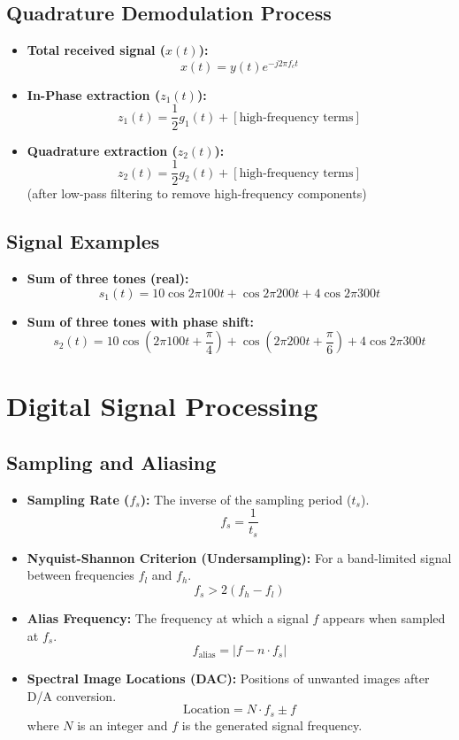 \documentclass{article}
\begin{document}
\subsection*{Quadrature Demodulation Process}
\begin{itemize}
    \item \textbf{Total received signal ($x(t)$):}
    \[
    x(t) = y(t) e^{-j2\pi f_c t}
    \]
    \item \textbf{In-Phase extraction ($z_1(t)$):}
    \[
    z_1(t) = \frac{1}{2} g_1(t) + [\text{high-frequency terms}]
    \]
    \item \textbf{Quadrature extraction ($z_2(t)$):}
    \[
    z_2(t) = \frac{1}{2} g_2(t) + [\text{high-frequency terms}]
    \]
    (after low-pass filtering to remove high-frequency components)
\end{itemize}

\subsection*{Signal Examples}
\begin{itemize}
    \item \textbf{Sum of three tones (real):}
    \[
    s_1(t) = 10 \cos 2\pi 100t + \cos 2\pi 200t + 4 \cos 2\pi 300t
    \]
    \item \textbf{Sum of three tones with phase shift:}
    \[
    s_2(t) = 10 \cos\left(2\pi 100t + \frac{\pi}{4}\right) + \cos\left(2\pi 200t + \frac{\pi}{6}\right) + 4 \cos 2\pi 300t
    \]
\end{itemize}

\newpage
\section{Digital Signal Processing}

\subsection*{Sampling and Aliasing}
\begin{itemize}
    \item \textbf{Sampling Rate ($f_s$):} The inverse of the sampling period ($t_s$).
    \[
    f_s = \frac{1}{t_s}
    \]
    \item \textbf{Nyquist-Shannon Criterion (Undersampling):} For a band-limited signal between frequencies $f_l$ and $f_h$.
    \[
    f_s > 2(f_h - f_l)
    \]
    \item \textbf{Alias Frequency:} The frequency at which a signal $f$ appears when sampled at $f_s$.
    \[
    f_{\text{alias}} = |f - n \cdot f_s|
    \]
    \item \textbf{Spectral Image Locations (DAC):} Positions of unwanted images after D/A conversion.
    \[
    \text{Location} = N \cdot f_s \pm f
    \]
    where $N$ is an integer and $f$ is the generated signal frequency.
\end{itemize}
\end{document}
